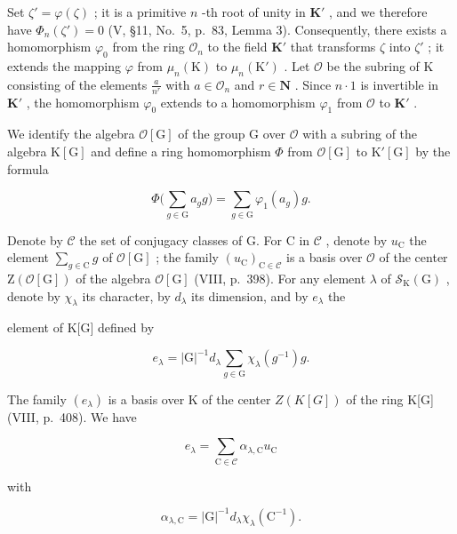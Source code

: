 Set \(\zeta' = \varphi(\zeta)\) ; it is a primitive \(n\) -th root of unity in \(\mathbf{K}'\) , and we therefore have \(\Phi_n(\zeta') = 0\) (V, §11, No.~5, p.~83, Lemma 3). Consequently, there exists a homomorphism \(\varphi_0\) from the ring \(\mathcal{O}_n\) to the field \(\mathbf{K}'\) that transforms \(\zeta\) into \(\zeta'\) ; it extends the mapping \(\varphi\) from \(\mu_n(\mathrm{K})\) to \(\mu_n(\mathrm{K}')\) . Let \(\mathcal{O}\) be the subring of \(\mathrm{K}\) consisting of the elements \(\frac{a}{n^r}\) with \(a \in \mathcal{O}_n\) and \(r \in \mathbf{N}\) . Since \(n \cdot 1\) is invertible in \(\mathbf{K}'\) , the homomorphism \(\varphi_0\) extends to a homomorphism \(\varphi_1\) from \(\mathcal{O}\) to \(\mathbf{K}'\) .

We identify the algebra \(\mathcal{O}[\mathrm{G}]\) of the group \(\mathrm{G}\) over \(\mathcal{O}\) with a subring of the algebra \(\mathrm{K}[\mathrm{G}]\) and define a ring homomorphism \(\Phi\) from \(\mathcal{O}[\mathrm{G}]\) to \(\mathrm{K}'[\mathrm{G}]\) by the formula

\[
\Phi \bigg (\sum_ {g \in \mathrm{G}} a _ {g} g \bigg) = \sum_ {g \in \mathrm{G}} \varphi_ {1} (a _ {g}) g.\tag{42}
\]

Denote by \(\mathcal{C}\) the set of conjugacy classes of G. For C in \(\mathcal{C}\) , denote by \(u_{\mathrm{C}}\) the element \(\sum_{g\in \mathrm{C}}g\) of \(\mathcal{O}[\mathrm{G}]\) ; the family \((u_{\mathrm{C}})_{\mathrm{C}\in \mathcal{C}}\) is a basis over \(\mathcal{O}\) of the center \(\mathrm{Z}(\mathcal{O}[\mathrm{G}])\) of the algebra \(\mathcal{O}[\mathrm{G}]\) (VIII, p.~398). For any element \(\lambda\) of \(\mathcal{S}_{\mathrm{K}}(\mathrm{G})\) , denote by \(\chi_{\lambda}\) its character, by \(d_{\lambda}\) its dimension, and by \(e_{\lambda}\) the

element of K{[}G{]} defined by

\[
e _ {\lambda} = | \mathrm{G} | ^ {- 1} d _ {\lambda} \sum_ {g \in \mathrm{G}} \chi_ {\lambda} (g ^ {- 1}) g.\tag{43}
\]

The family \((e_{\lambda})\) is a basis over K of the center \(Z(K[G])\) of the ring K{[}G{]} (VIII, p.~408). We have

\[
e _ {\lambda} = \sum_ {\mathrm{C} \in \mathcal {C}} \alpha_ {\lambda , \mathrm{C}} u _ {\mathrm{C}}\tag{44}
\]

with

\[
\alpha_ {\lambda , \mathrm{C}} = | \mathrm{G} | ^ {- 1} d _ {\lambda} \chi_ {\lambda} (\mathrm{C} ^ {- 1}).\tag{45}
\]

